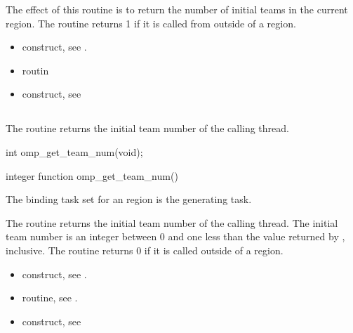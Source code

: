 \effect
The effect of this routine is to return the number of initial teams in the current  region.
The routine returns 1 if it is called from outside of a  region.

\crossreferences
\begin{itemize}

\item {} construct, see
.

\item {} routin


\item {} construct, see
\end{itemize}











\subsection{}
\label{subsec:omp_get_team_num}
\summary
The  routine returns the initial team number of the calling thread.

\format
\begin{ccppspecific}
\begin{ompcFunction}
int omp_get_team_num(void);
\end{ompcFunction}
\end{ccppspecific}

\begin{fortranspecific}
\begin{ompfFunction}
integer function omp_get_team_num()
\end{ompfFunction}
\end{fortranspecific}

\binding
The binding task set for an  region is the generating task.

\effect
The  routine returns the initial team number of the calling thread. The
initial team number is an integer between 0 and one less than the value returned by
, inclusive. The routine returns 0 if it is called outside of a
 region.

\crossreferences
\begin{itemize}

\item {} construct, see
.

\item {} routine, see
.

\item {} construct, see

\end{itemize}









